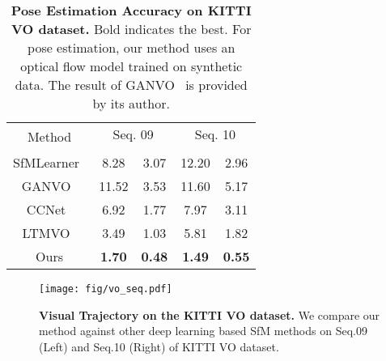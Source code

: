 \documentclass[final]{cvpr}
\begin{document}
\begin{table}
\begin{center}
\tabcolsep=0.1cm
\caption{\small\textbf{Pose Estimation Accuracy on KITTI VO dataset.} Bold indicates the best. For pose estimation, our method uses an optical flow model trained on synthetic data. The result of GANVO~\cite{GANVO} is provided by its author.}
\label{tab:kitti_pose}
\footnotesize
\begin{tabular}{c|c|c |c|c}
\hline
 \multirow{2}{*}{Method}  & \multicolumn{2}{c|}{Seq. 09} & \multicolumn{2}{c}{Seq. 10} \\
\cline{2-5}
& & & & \\
\hline
SfMLearner~\cite{sfmlearner}& 8.28 &3.07&12.20 &2.96\\
GANVO~\cite{GANVO} & 11.52 &3.53 & 11.60 & 5.17 \\
CCNet~\cite{Ranjan_2019_CVPR}&6.92 &1.77& 7.97 &3.11 \\
LTMVO~\cite{zou2020learning} &3.49&1.03&5.81&1.82 \\

Ours& \textbf{1.70} & \textbf{0.48} & \textbf{1.49} & \textbf{0.55} \\

\hline
\end{tabular}
\end{center}
\vspace{-3mm}
\end{table}

\begin{figure}[ht]
\begin{center}
  \texttt{[image: fig/vo\_seq.pdf]}
\end{center}
\vspace{-3mm}
  \caption{\small \textbf{Visual Trajectory on the KITTI VO dataset.} We compare our method against other deep learning based SfM methods on Seq.09 (Left)  and Seq.10 (Right) of KITTI VO dataset.}
  \vspace{-3mm}
\label{fig:kitti_traj}
\end{figure}
\end{document}

